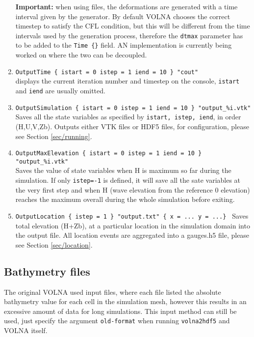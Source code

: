 \documentclass[11pt]{article}
\begin{document}
\begin{enumerate}
\textbf{Important:} when using files, the deformations are generated with a time interval given by the generator. By default VOLNA chooses the correct timestep to satisfy the CFL condition, but this will be different from the time intervals used by the generation process, therefore the \texttt{dtmax} parameter has to be added to the \texttt{Time \{\}} field. AN implementation is currently being worked on where the two can be decoupled.

\item \texttt{OutputTime \{ istart = 0 istep = 1 iend = 10 \} "cout"}\\
displays the current iteration number and timestep on the console, \texttt{istart} and \texttt{iend} are usually omitted.

\item \texttt{OutputSimulation \{ istart = 0 istep = 1 iend = 10 \} "output\_\%i.vtk" } \\
Saves all the state variables as specified by \texttt{istart, istep, iend}, in order (H,U,V,Zb). Outputs either VTK files or HDF5 files, for configuration, please see Section \ref{sec/running}.

\item \texttt{OutputMaxElevation \{ istart = 0 istep = 1 iend = 10 \} "output\_\%i.vtk" } \\
Saves the value of state variables when H is maximum so far during the simulation. If only \texttt{istep=-1} is defined, it will save all the sate variables at the very first step and when H (wave elevation from the reference 0 elevation) reaches the maximum overall during the whole simulation before exiting.

\item \texttt{OutputLocation \{ istep = 1 \} "output.txt" \{ x = ... y = ...\} }
Saves total elevation (H+Zb), at a particular location in the simulation domain into the output file. All location events are aggregated into a gauges.h5 file, please see Section \ref{sec/location}.

\end{enumerate}

\subsection{Bathymetry files} \label{sec/bathy}
The original VOLNA used input files, where each file listed the absolute bathymetry value for each cell in the simulation mesh, however this results in an excessive amount of data for long simulations. This input method can still be used, just specify the argument \texttt{old-format} when running \texttt{volna2hdf5} and VOLNA itself.
\end{document}
